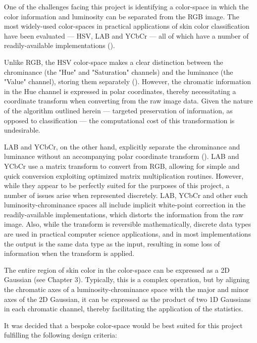 One of the challenges facing this project is identifying a color-space in which the color information and luminosity can be separated from the RGB image. The most widely-used color-spaces in practical applications of skin color classification have been evaluated --- HSV, LAB and YCbCr --- all of which have a number of readily-available implementations (\cite{Vezhnevets2003,Zarit1999a,Yang1997a,Brand2000a,Sigal2000a,Chai2000a,Phung2002a}).

Unlike RGB, the HSV color-space makes a clear distinction between the chrominance (the "Hue" and "Saturation" channels) and the luminance (the "Value" channel), storing them separately (\cite{Vezhnevets2003,Sigal2000a}). However, the chromatic information in the Hue channel is expressed in polar coordinates, thereby necessitating a coordinate transform when converting from the raw image data. Given the nature of the algorithm outlined herein --- targeted preservation of information, as opposed to classification ---  the computational cost of this transformation is undesirable.

LAB and YCbCr, on the other hand, explicitly separate the chrominance and luminance without an accompanying polar coordinate transform (\cite{Vezhnevets2003,Poynton1997,Phung2002a}). LAB and YCbCr use a matrix transform to convert from RGB, allowing for simple and quick conversion exploiting optimized matrix multiplication routines. However, while they appear to be perfectly suited for the purposes of this project, a number of issues arise when represented discretely. LAB, YCbCr and other such luminosity-chrominance spaces all include implicit white-point correction in the readily-available implementations, which distorts the information from the raw image. Also, while the transform is reversible mathematically, discrete data types are used in practical computer science applications, and in most implementations the output is the same data type as the input, resulting in some loss of information when the transform is applied.

The entire region of skin color in the color-space can be expressed as a 2D Gaussian (see Chapter 3). Typically, this is a complex operation, but by aligning the chromatic axes of a luminosity-chrominance space with the major and minor axes of the 2D Gaussian, it can be expressed as the product of two 1D Gaussians in each chromatic channel, thereby facilitating the application of the statistics. 

It was decided that a bespoke color-space would be best suited for this project fulfilling the following design criteria:

